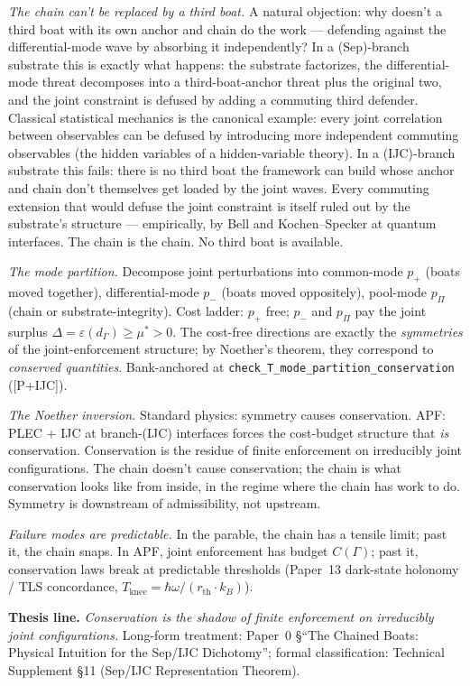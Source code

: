 \documentclass[11pt]{article}
\theoremstyle{remark}
\begin{document}
\begin{tcolorbox}[apfbox, title={Physical intuition: the chained boats and the IJC dichotomy}]
\smallskip\noindent\textit{The chain can't be replaced by a third boat.}  A natural objection: why doesn't a third boat with its own anchor and chain do the work --- defending against the differential-mode wave by absorbing it independently?  In a (Sep)-branch substrate this is exactly what happens: the substrate factorizes, the differential-mode threat decomposes into a third-boat-anchor threat plus the original two, and the joint constraint is defused by adding a commuting third defender.  Classical statistical mechanics is the canonical example: every joint correlation between observables can be defused by introducing more independent commuting observables (the hidden variables of a hidden-variable theory).  In a (IJC)-branch substrate this fails: there is no third boat the framework can build whose anchor and chain don't themselves get loaded by the joint waves.  Every commuting extension that would defuse the joint constraint is itself ruled out by the substrate's structure --- empirically, by Bell and Kochen--Specker at quantum interfaces.  The chain is the chain.  No third boat is available.

\smallskip\noindent\textit{The mode partition.}  Decompose joint perturbations into common-mode $p_+$ (boats moved together), differential-mode $p_-$ (boats moved oppositely), pool-mode $p_\Pi$ (chain or substrate-integrity).  Cost ladder: $p_+$ free; $p_-$ and $p_\Pi$ pay the joint surplus $\Delta = \varepsilon(d_\Gamma) \geq \mu^* > 0$.  The cost-free directions are exactly the \emph{symmetries} of the joint-enforcement structure; by Noether's theorem, they correspond to \emph{conserved quantities}.  Bank-anchored at \texttt{check\_T\_mode\_partition\_conservation} ([P+IJC]).

\smallskip\noindent\textit{The Noether inversion.}  Standard physics: symmetry causes conservation.  APF: PLEC + IJC at branch-(IJC) interfaces forces the cost-budget structure that \emph{is} conservation.  Conservation is the residue of finite enforcement on irreducibly joint configurations.  The chain doesn't cause conservation; the chain is what conservation looks like from inside, in the regime where the chain has work to do.  Symmetry is downstream of admissibility, not upstream.

\smallskip\noindent\textit{Failure modes are predictable.}  In the parable, the chain has a tensile limit; past it, the chain snaps.  In APF, joint enforcement has budget $C(\Gamma)$; past it, conservation laws break at predictable thresholds (Paper~13 dark-state holonomy / TLS concordance, $T_{\mathrm{knee}} = \hbar\omega/(r_{\mathrm{th}} \cdot k_B)$).

\smallskip\noindent\textbf{Thesis line.}  \emph{Conservation is the shadow of finite enforcement on irreducibly joint configurations.}  Long-form treatment: Paper~0 \S``The Chained Boats: Physical Intuition for the Sep/IJC Dichotomy''; formal classification: Technical Supplement \S11 (Sep/IJC Representation Theorem).
\end{tcolorbox}
\end{document}
